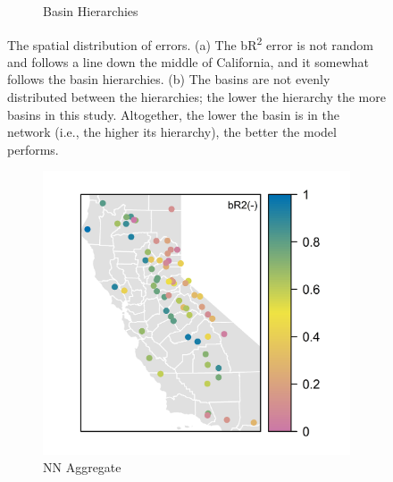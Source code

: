\begin{figure}
\begin{subfigure}{.5\textwidth}
  		\caption{Basin Hierarchies}
	\end{subfigure}%
	\hfill
	\caption{The spatial distribution of errors. (a) The bR\textsuperscript{2} error is not random and follows a line down the middle of California, and it somewhat follows the basin hierarchies. (b) The basins are not evenly distributed between the hierarchies; the lower the hierarchy the more basins in this study. Altogether, the lower the basin is in the network (i.e., the higher its hierarchy), the better the model performs.}
	\label{fig:incbr2plus}
\end{figure}

\begin{figure}
	\centering
	\begin{subfigure}{.5\textwidth}
  		\centering
 		 \includegraphics[width=\textwidth, trim={0 0 0 0}, clip=true]{plots/rplot28_br2map_nn_agg.png}
  		\caption{NN Aggregate}
	\end{subfigure}%
	\begin{subfigure}{.5\textwidth}
  		\centering

\end{subfigure}
\end{figure}
